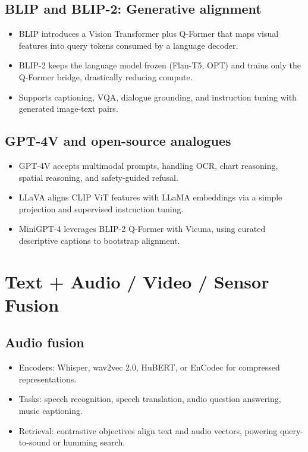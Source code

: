\documentclass{article}
\begin{document}
\subsection{BLIP and BLIP-2: Generative alignment}
\begin{itemize}
  \item BLIP introduces a Vision Transformer plus Q-Former that maps visual features into query tokens consumed by a language decoder.
  \item BLIP-2 keeps the language model frozen (Flan-T5, OPT) and trains only the Q-Former bridge, drastically reducing compute.
  \item Supports captioning, VQA, dialogue grounding, and instruction tuning with generated image-text pairs.
\end{itemize}

\subsection{GPT-4V and open-source analogues}
\begin{itemize}
  \item GPT-4V accepts multimodal prompts, handling OCR, chart reasoning, spatial reasoning, and safety-guided refusal.
  \item LLaVA aligns CLIP ViT features with LLaMA embeddings via a simple projection and supervised instruction tuning.
  \item MiniGPT-4 leverages BLIP-2 Q-Former with Vicuna, using curated descriptive captions to bootstrap alignment.
\end{itemize}

\section{Text + Audio / Video / Sensor Fusion}
\subsection{Audio fusion}
\begin{itemize}
  \item Encoders: Whisper, wav2vec 2.0, HuBERT, or EnCodec for compressed representations.
  \item Tasks: speech recognition, speech translation, audio question answering, music captioning.
  \item Retrieval: contrastive objectives align text and audio vectors, powering query-to-sound or humming search.
\end{itemize}
\end{document}
